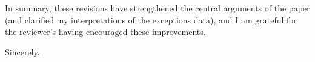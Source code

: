 \documentclass [11pt]{letter}
\begin{document}
\begin{letter}
\begin{enumerate}
\end{enumerate}

In summary, these revisions have strengthened the central arguments of
the paper (and clarified my interpretations of the exceptions data),
and I am grateful for the reviewer's having encouraged these
improvements.

\closing{Sincerely,}

\end{letter}
\end{document}
